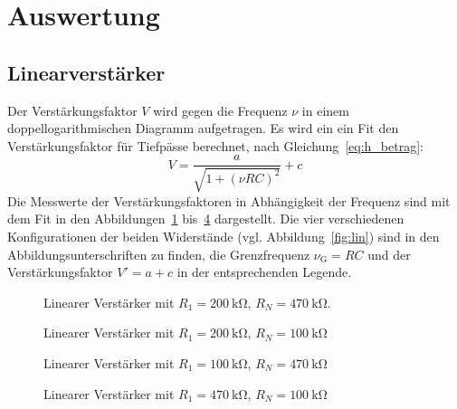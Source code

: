 \section{Auswertung}%
\label{sec:auswertung}
\subsection{Linearverst\"arker}
Der Verstärkungsfaktor $V$ wird gegen die Frequenz $\nu$ in einem doppellogarithmischen Diagramm aufgetragen.
Es wird ein ein Fit den Verstärkungsfaktor für Tiefpässe berechnet, nach Gleichung~\eqref{eq:h_betrag}:
\begin{equation}
  V = \frac{a}{\sqrt{1 + {\left(\nu RC\right)}^{2}}} + c
\end{equation}
Die Messwerte der Verstärkungsfaktoren in Abhängigkeit der Frequenz
sind mit dem Fit in den Abbildungen~\ref{fig:lin_verst_01} bis~\ref{fig:lin_verst_04} dargestellt.
Die vier verschiedenen Konfigurationen der beiden Widerstände (vgl. Abbildung~\ref{fig:lin})
sind in den Abbildungsunterschriften zu finden,
die Grenzfrequenz $\nu_\text{G} = RC$ und der Verstärkungsfaktor $V' = a + c$ in der entsprechenden Legende.

\begin{figure}[ht]
  \centering
  
  \caption{Linearer Verst\"arker mit $R_1 = \SI{200}{\kilo\ohm}$, $R_N = \SI{470}{\kilo\ohm}$.}
  \label{fig:lin_verst_01}
\end{figure}

\begin{figure}[ht]
  \centering
  
  \caption{Linearer Verst\"arker mit $R_1 = \SI{200}{\kilo\ohm}$, $R_N = \SI{100}{\kilo\ohm}$}
  \label{fig:lin_verst_02}
\end{figure}

\begin{figure}[ht]
  \centering
  
  \caption{Linearer Verst\"arker mit $R_1 = \SI{100}{\kilo\ohm}$, $R_N = \SI{470}{\kilo\ohm}$}
  \label{fig:lin_verst_03}
\end{figure}

\begin{figure}[ht]
  \centering
  
  \caption{Linearer Verst\"arker mit $R_1 = \SI{470}{\kilo\ohm}$, $R_N = \SI{100}{\kilo\ohm}$}
  \label{fig:lin_verst_04}
\end{figure}

